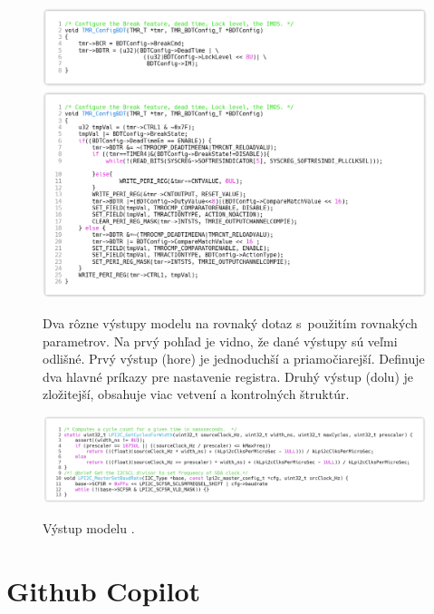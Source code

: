 \begin{figure}[H]
    \centering
    \includegraphics[width=1\textwidth]{obrazky/mc1.1.png}\\
    \includegraphics[width=1\textwidth]{obrazky/mc1.png}\\
    \caption{Dva rôzne výstupy modelu \MC{} na rovnaký dotaz s~použitím rovnakých parametrov. Na prvý pohľad je vidno, že dané výstupy sú veľmi odlišné. Prvý výstup (hore) je jednoduchší a priamočiarejší. Definuje dva hlavné príkazy pre nastavenie registra. Druhý výstup (dolu) je zložitejší, obsahuje viac vetvení a kontrolných štruktúr.}
    \label{fig:mc-comp}
\end{figure}

\begin{figure}[H]
    \centering
    \includegraphics[width=1\textwidth]{obrazky/mc589.png}\\
    \caption{Výstup modelu \MC{}.}
    \label{fig:mc589}
\end{figure}

\section{Github Copilot}

